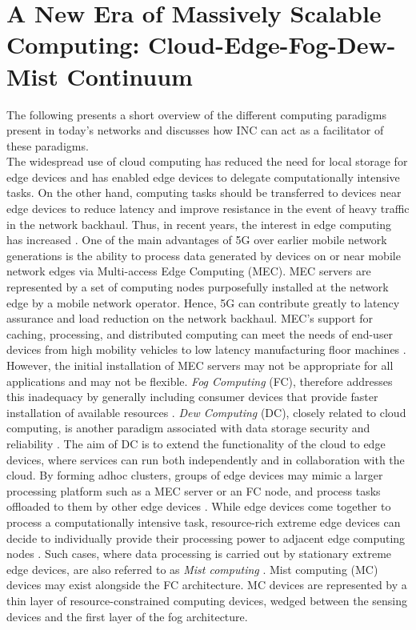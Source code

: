 \section{A New Era of Massively Scalable Computing:  Cloud-Edge-Fog-Dew-Mist Continuum}\label{ComputingParadigm}

The following presents a short overview of the different computing paradigms present in today's networks and discusses how INC can act as a facilitator of these paradigms.\\
The widespread use of cloud computing has reduced the need for local storage for edge devices and has enabled edge devices to delegate computationally intensive tasks. On the other hand, computing tasks should be transferred to devices near edge devices to reduce latency and improve resistance in the event of heavy traffic in the network backhaul. Thus, in recent years, the interest in edge computing has increased \cite{FIROUZI2021101840}.  One of the main advantages of 5G over earlier mobile network generations is the ability to process data generated by devices on or near mobile network edges via Multi-access Edge Computing (MEC). MEC servers are represented by a set of computing nodes purposefully installed at the network edge by a mobile network operator.  Hence, 5G can contribute greatly to latency assurance and load reduction on the network backhaul. MEC's support for caching, processing, and distributed computing can meet the needs of end-user devices from high mobility vehicles to low latency manufacturing floor machines \cite{7931566}. However, the initial installation of MEC servers may not be appropriate for all applications and may not be flexible. \textit{Fog Computing} (FC), therefore addresses this inadequacy by generally including consumer devices that provide faster installation of available resources \cite{7543455}. \textit{Dew Computing} (DC), closely related to cloud computing, is another paradigm associated with data storage security and reliability \cite{Wang2016DefinitionAC}. The aim of DC is to extend the functionality of the cloud to edge devices, where services can run both independently and in collaboration with the cloud.  
By forming adhoc clusters, groups of edge devices may mimic a larger processing platform such as a MEC server or an FC node, and process tasks offloaded to them by other edge devices \cite{894385}. While edge devices come together to process a computationally intensive task, resource-rich extreme edge devices can decide to individually provide their processing power to adjacent edge computing nodes \cite{8486685}. Such cases, where data processing is carried out by stationary extreme edge devices, are also referred to as \textit{Mist computing} \cite{lea2020iot}. Mist computing (MC) devices may exist alongside the FC architecture. MC devices are represented by a thin layer of resource-constrained computing devices, wedged between the sensing devices and the first layer of the fog architecture. 
